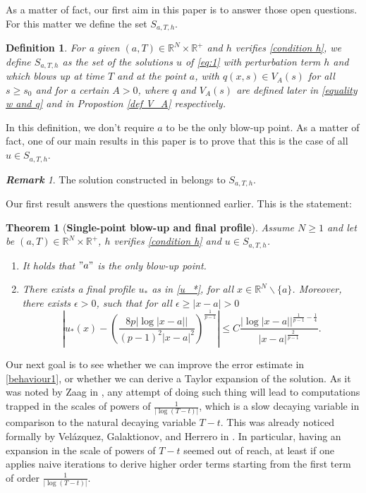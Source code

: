 \documentclass[11pt,a4paper]{article}
\newcommand{\1}{\mathbbm{1}}
\numberwithin{equation}{section}
\newcommand{\numberset}{\mathbb}
\newcommand{\R}{\numberset{R}}
\newtheorem{theorem}{Theorem}
\newtheorem{defn}[lemma]{Definition}
\theoremstyle{remark}
\newtheorem*{remark}{\textbf{Remark}}
\begin{document}
As a matter of fact, our first aim in this paper is to answer those open questions. For this matter we define the set $S_{a,T,h}$.
\begin{defn}
   For a given $(a,T)\in \R^N\times \R^+$ and $h$ verifies \eqref{condition h}, we define $S_{a,T,h}$ as the set of the solutions $u$ of \eqref{eq:1} with perturbation term $h$ and which blows up at time $T$ and at the point $a$, with $q(x,s)\in V_A(s)$ for all $s\geq s_0$ and for a certain $A>0$, where $q$ and $V_A(s)$ are defined later in \eqref{equality w and q} and in Propostion \ref{def V_A} respectively.
\end{defn}
In this definition, we don't require $a$ to be the only blow-up point. As a matter of fact, one of our main results in this paper is to prove that this is the case of all $u\in S_{a,T,h}.$
\begin{remark}
    The solution constructed in \cite{EZ2011} belongs to $S_{a,T,h}$.
\end{remark}
Our first result answers the questions mentionned earlier. This is the statement:
\begin{theorem}[\textbf{Single-point blow-up and final profile}]\label{Thm 2 g}
Assume $N\geq 1$ and let be $(a,T)\in \R^N\times \R^+$, $h$ verifies \eqref{condition h} and $u\in S_{a,T,h}$.
\begin{enumerate}[label=(\roman*)]
\item It holds that $"a"$ is the only blow-up point.
\item There exists a final profile $u_*$ as in \eqref{u_*}, for all $x\in \R^N\backslash \{a\}$. Moreover, there exists $\epsilon>0$, such that for all $\epsilon\geq |x-a|> 0$\label{Thm 2 ii}
\begin{equation}\label{Thm 2}
\left|u_*(x)-\left(\frac{8p|\log|x-a||}{(p-1)^2|x-a|^{2}}\right)^{\frac{1}{p-1}}\right|\leq C\frac {|\log|x-a||^{\frac{1}{p-1} - \frac{1}{4}}} {|x-a|^{\frac{2}{p-1}}}.
\end{equation}
\end{enumerate}
\end{theorem}




Our next goal is to see whether we can improve the error estimate in \eqref{behaviour1}, or whether we can derive a Taylor expansion of the solution. As it was noted by Zaag in \cite{Z2002}, any attempt of doing such thing will lead to computations trapped in the scales of powers of $\frac{1}{|\log(T-t)|}$, which is a slow decaying variable in comparison to the natural decaying variable $T-t$. This was already noticed formally by Vel{\'a}zquez, Galaktionov, and Herrero in \cite{VGH1991}. In particular, having an expansion in the scale of powers of $T-t$ seemed out of reach, at least if one applies naive iterations to derive higher order terms starting from the first term of order $\frac{1}{|\log(T-t)|}$.
\end{document}
